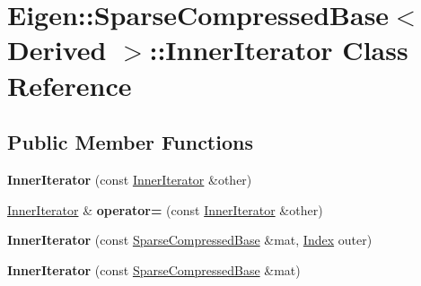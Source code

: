 \hypertarget{class_eigen_1_1_sparse_compressed_base_1_1_inner_iterator}{}\section{Eigen\+::Sparse\+Compressed\+Base$<$ Derived $>$\+::Inner\+Iterator Class Reference}
\label{class_eigen_1_1_sparse_compressed_base_1_1_inner_iterator}
\subsection*{Public Member Functions}
\begin{DoxyCompactItemize}
\item 
\mbox{\label{class_eigen_1_1_sparse_compressed_base_1_1_inner_iterator_a0d898de5e4edb9f6404680262b52f898}} 
{\bfseries Inner\+Iterator} (const \mbox{\hyperlink{class_eigen_1_1_sparse_compressed_base_1_1_inner_iterator}{Inner\+Iterator}} \&other)
\item 
\mbox{\label{class_eigen_1_1_sparse_compressed_base_1_1_inner_iterator_a4ed64fd87d75a3be8a40c91b81cddcbd}} 
\mbox{\hyperlink{class_eigen_1_1_sparse_compressed_base_1_1_inner_iterator}{Inner\+Iterator}} \& {\bfseries operator=} (const \mbox{\hyperlink{class_eigen_1_1_sparse_compressed_base_1_1_inner_iterator}{Inner\+Iterator}} \&other)
\item 
\mbox{\label{class_eigen_1_1_sparse_compressed_base_1_1_inner_iterator_abd6788696bf6487edc36b9bf1cbc4a4a}} 
{\bfseries Inner\+Iterator} (const \mbox{\hyperlink{class_eigen_1_1_sparse_compressed_base}{Sparse\+Compressed\+Base}} \&mat, \mbox{\hyperlink{struct_eigen_1_1_eigen_base_a554f30542cc2316add4b1ea0a492ff02}{Index}} outer)
\item 
\mbox{\label{class_eigen_1_1_sparse_compressed_base_1_1_inner_iterator_a174dcae1aa9e7856a13f645a5fa9b524}} 
{\bfseries Inner\+Iterator} (const \mbox{\hyperlink{class_eigen_1_1_sparse_compressed_base}{Sparse\+Compressed\+Base}} \&mat)
\item 
\mbox{\label{class_eigen_1_1_sparse_compressed_base_1_1_inner_iterator_ad4da121e9806347dff38c6e81b6fd002}} 

\end{DoxyCompactItemize}
